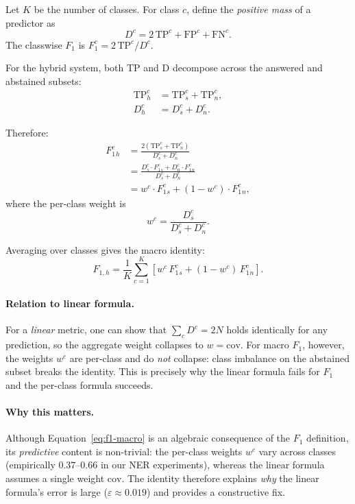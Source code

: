 \documentclass[11pt,a4paper]{article}
\begin{document}
Let $K$ be the number of classes. For class $c$, define the
\emph{positive mass} of a predictor as
\begin{equation}
D^c = 2\,\mathrm{TP}^c + \mathrm{FP}^c + \mathrm{FN}^c.
\label{eq:D-def}
\end{equation}
The classwise $F_1$ is $F_1^c = 2\,\mathrm{TP}^c / D^c$.

For the hybrid system, both TP and D decompose across the answered
and abstained subsets:
\begin{align}
\mathrm{TP}^c_h &= \mathrm{TP}^c_s + \mathrm{TP}^c_n, \\
D^c_h &= D^c_s + D^c_n.
\end{align}

Therefore:
\begin{align}
F_1^c_h &= \frac{2(\mathrm{TP}^c_s + \mathrm{TP}^c_n)}{D^c_s + D^c_n} \\
&= \frac{D^c_s \cdot F_1^c_s + D^c_n \cdot F_1^c_n}{D^c_s + D^c_n} \\
&= w^c \cdot F_1^c_s + (1-w^c) \cdot F_1^c_n,
\label{eq:f1-class}
\end{align}
where the per-class weight is
\begin{equation}
w^c = \frac{D^c_s}{D^c_s + D^c_n}.
\label{eq:w-def}
\end{equation}

Averaging over classes gives the macro identity:
\begin{equation}
F_{1,h} = \frac{1}{K} \sum_{c=1}^{K}
\left[ w^c \, F_1^c_s + (1 - w^c) \, F_1^c_n \right].
\label{eq:f1-macro}
\end{equation}

\paragraph{Relation to linear formula.}
For a \emph{linear} metric, one can show that
$\sum_c D^c = 2N$ holds identically for any prediction, so
the aggregate weight collapses to $w = \text{cov}$. For macro $F_1$,
however, the weights $w^c$ are per-class and do \emph{not} collapse:
class imbalance on the abstained subset breaks the identity.
This is precisely why the linear formula fails for $F_1$ and the
per-class formula succeeds.

\paragraph{Why this matters.}
Although Equation~\ref{eq:f1-macro} is an algebraic consequence of the
$F_1$ definition, its \emph{predictive} content is non-trivial: the
per-class weights $w^c$ vary across classes (empirically $0.37$--$0.66$
in our NER experiments), whereas the linear formula assumes a single
weight $\text{cov}$. The identity therefore explains \emph{why} the
linear formula's error is large ($\varepsilon \approx 0.019$) and
provides a constructive fix.
\end{document}
